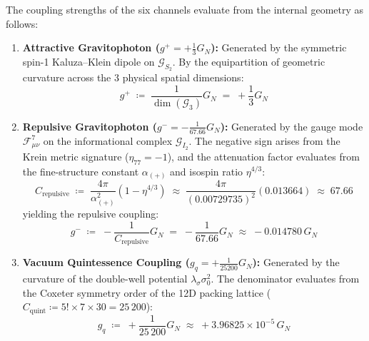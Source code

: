\documentclass[
    12pt,
    a4paper,
    headings=normal,
    twoside=false,
    open=any,
    parskip=half
]{scrbook}
\begin{document}
\begin{phystheorem}\label{thm:ch10_derivation_couplings}
The coupling strengths of the six channels evaluate from the internal geometry as follows:
\begin{enumerate}[label=(\alph*), noitemsep]
    \item \textbf{Attractive Gravitophoton ($g^+ = +\frac{1}{3}G_N$):}  
    Generated by the symmetric spin-1 Kaluza--Klein dipole on $\mathcal{G}_{S_2}$. By the equipartition of geometric curvature across the 3 physical spatial dimensions:
    \begin{equation}
    \boxed{g^+ \;\coloneqq\; \frac{1}{\dim(\mathcal{G}_3)} G_N \;=\; +\frac{1}{3} G_N}
    \label{eq:ch10_g_plus_formula}
    \end{equation}

    \item \textbf{Repulsive Gravitophoton ($g^- = -\frac{1}{67.66}G_N$):}  
    Generated by the gauge mode $\mathcal{F}_{\mu\nu}^7$ on the informational complex $\mathcal{G}_{I_2}$. The negative sign arises from the Krein metric signature ($\eta_{77} = -1$), and the attenuation factor evaluates from the fine-structure constant $\alpha_{(+)}$ and isospin ratio $\eta^{4/3}$:
    \begin{equation}
    C_{\text{repulsive}} \;\coloneqq\; \frac{4\pi}{\alpha_{(+)}^2} \left( 1 - \eta^{4/3} \right) \;\approx\; \frac{4\pi}{(0.00729735)^2} (0.013664) \;\approx\; \mathbf{67.66}
    \label{eq:ch10_c_repulsive_formula}
    \end{equation}
    yielding the repulsive coupling:
    \begin{equation}
    \boxed{g^- \;\coloneqq\; -\frac{1}{C_{\text{repulsive}}} G_N \;=\; -\frac{1}{67.66} G_N \;\approx\; -0.014780 \, G_N}
    \label{eq:ch10_g_minus_formula}
    \end{equation}
    \item \textbf{Vacuum Quintessence Coupling ($g_q = +\frac{1}{25200}G_N$):}  
    Generated by the curvature of the double-well potential $\lambda_\sigma \sigma_0^2$. The denominator evaluates from the Coxeter symmetry order of the 12D packing lattice ($C_{\text{quint}} \coloneqq 5! \times 7 \times 30 = 25\,200$):
    \begin{equation}
    \boxed{g_q \;\coloneqq\; +\frac{1}{25\,200} G_N \;\approx\; +3.96825 \times 10^{-5} \, G_N}
    \label{eq:ch10_g_q_formula}
    \end{equation}
\end{enumerate}
\end{phystheorem}
\end{document}
